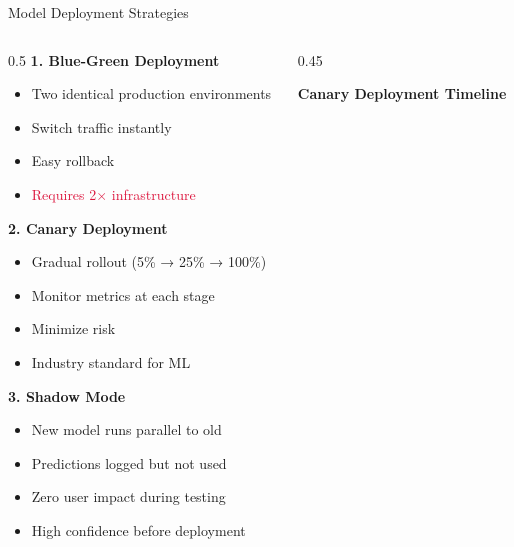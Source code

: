 \begin{frame}{Model Deployment Strategies}
\begin{columns}
\begin{column}{0.5\textwidth}
\textbf{1. Blue-Green Deployment}
\begin{itemize}
\item Two identical production environments
\item Switch traffic instantly
\item Easy rollback
\item \textcolor{crimson}{Requires 2× infrastructure}
\end{itemize}

\vspace{0.3cm}
\textbf{2. Canary Deployment}
\begin{itemize}
\item Gradual rollout (5\% → 25\% → 100\%)
\item Monitor metrics at each stage
\item Minimize risk
\item \textcolor{forest}{Industry standard for ML}
\end{itemize}

\vspace{0.3cm}
\textbf{3. Shadow Mode}
\begin{itemize}
\item New model runs parallel to old
\item Predictions logged but not used
\item Zero user impact during testing
\item High confidence before deployment
\end{itemize}
\end{column}

\begin{column}{0.45\textwidth}
\begin{center}
\textbf{Canary Deployment Timeline}
\end{center}

\end{column}
\end{columns}
\end{frame}
